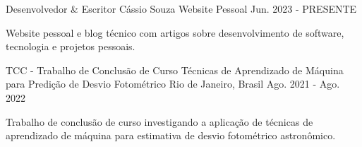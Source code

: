 

\begin{cventries}

  \cventry
    {Desenvolvedor \& Escritor} %
    {Cássio Souza} %
    {Website Pessoal} %
    {Jun. 2023 - PRESENTE} %
    {
      \begin{cvitems} %
        \item {Website pessoal e blog técnico com artigos sobre desenvolvimento de software, tecnologia e projetos pessoais.}
      \end{cvitems}
    }

  \cventry
    {TCC - Trabalho de Conclusão de Curso} %
    {Técnicas de Aprendizado de Máquina para Predição de Desvio Fotométrico} %
    {Rio de Janeiro, Brasil} %
    {Ago. 2021 - Ago. 2022} %
    {
      \begin{cvitems} %
        \item {Trabalho de conclusão de curso investigando a aplicação de técnicas de aprendizado de máquina para estimativa de desvio fotométrico astronômico.}
      \end{cvitems}
    }

\end{cventries}
